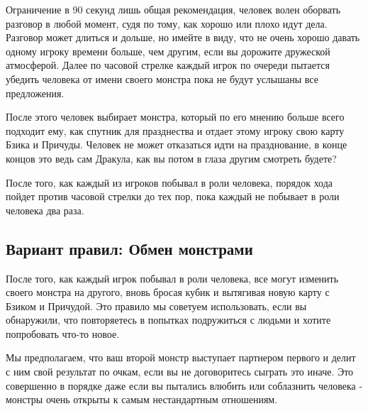 \documentclass[twoside,twocolumn]{article}
\begin{document}
Ограничение в 90 секунд лишь общая рекомендация, человек волен оборвать разговор в любой момент, судя по тому, как хорошо или плохо идут дела.
Разговор может длиться и дольше, но имейте в виду, что не очень хорошо давать одному игроку времени больше, чем другим, если вы дорожите дружеской атмосферой.
Далее по часовой стрелке каждый игрок по очереди пытается убедить человека от имени своего монстра пока не будут услышаны все предложения.

После этого человек выбирает монстра, который по его мнению больше всего подходит ему, как спутник для празднества и отдает этому игроку свою карту Бзика и Причуды.
Человек не может отказаться идти на празднование, в конце концов это ведь сам Дракула, как вы потом в глаза другим смотреть будете?

После того, как каждый из игроков побывал в роли человека, порядок хода пойдет против часовой стрелки до тех пор, пока каждый не побывает в роли человека два раза.

\subsection*{Вариант правил: Обмен монстрами}
После того, как каждый игрок побывал в роли человека, все могут изменить своего монстра на другого, вновь бросая кубик и вытягивая новую карту с Бзиком и Причудой.
Это правило мы советуем использовать, если вы обнаружили, что повторяетесь в попытках подружиться с людьми и хотите попробовать что-то новое.

Мы предполагаем, что ваш второй монстр выступает партнером первого и делит с ним свой результат по очкам, если вы не договоритесь сыграть это иначе.
Это совершенно в порядке даже если вы пытались влюбить или соблазнить человека - монстры очень открыты к самым нестандартным отношениям.
\end{document}

